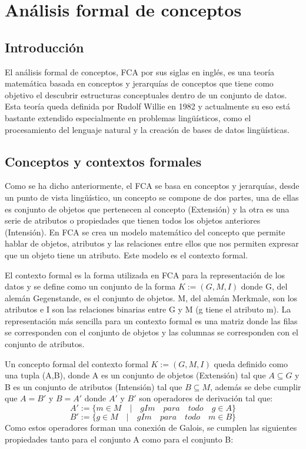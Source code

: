 \section{Análisis formal de conceptos}
\subsection{Introducción}

El análisis formal de conceptos, FCA por sus siglas en inglés, es una teoría matemática basada en conceptos y jerarquías de conceptos que tiene como objetivo el descubrir estructuras conceptuales dentro de un conjunto de datos. Esta teoría queda definida por Rudolf Willie en 1982 y actualmente su eso está bastante extendido especialmente en problemas lingüísticos, como el procesamiento del lenguaje natural y la creación de bases de datos lingüísticas.

\subsection{Conceptos y contextos formales}

Como se ha dicho anteriormente, el FCA se basa en conceptos y jerarquías, desde un punto de vista lingüístico, un concepto se compone de dos partes, una de ellas es conjunto de objetos que pertenecen al concepto (Extensión) y la otra es una serie de atributos o propiedades que tienen todos los objetos anteriores (Intensión). En FCA se crea un modelo matemático del concepto que permite hablar de objetos, atributos y las relaciones entre ellos que nos permiten expresar que un objeto tiene un atributo. Este modelo es el contexto formal. \cite{A3}

El contexto formal es la forma utilizada en FCA para la representación de los datos y se define como un conjunto de la forma $K := (G,M,I)$ donde G, del alemán Gegenstande, es el conjunto de objetos. M, del alemán Merkmale, son los atributos e I son las relaciones binarias entre G y M (g tiene el atributo m). La representación más sencilla para un contexto formal es una matriz donde las filas se corresponden con el conjunto de objetos y las columnas se corresponden con el conjunto de atributos.


Un concepto formal del contexto formal $K := (G,M,I)$ queda definido como una tupla (A,B), donde A es un conjunto de objetos (Extensión) tal que $A \subseteq G$ y B es un conjunto de atributos (Intensión) tal que $B \subseteq M$, además se debe cumplir que $A = B'$ y $B = A'$ donde $A'$ y $B'$ son operadores de derivación tal que:
\begin{equation}
A' := \{m \in M \quad | \quad gIm \quad para \quad todo \quad g \in A\}
\end{equation}
\begin{equation}
B' := \{g \in M \quad | \quad gIm \quad para \quad todo \quad m \in B\}
\end{equation}
Como estos operadores forman una conexión de Galois, se cumplen las siguientes propiedades tanto para el conjunto A como para el conjunto B:

